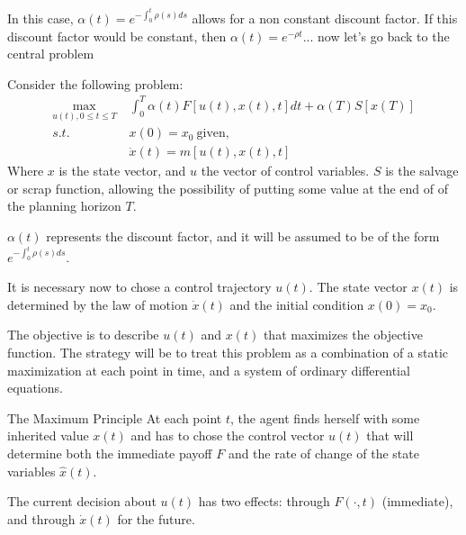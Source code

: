 \documentclass[aspectratio=169]{beamer}
\begin{document}
\begin{frame}{}
    In this case, $\alpha(t)=e^{-\int_0^t \rho(s)ds}$ allows for a non constant discount factor. If this discount factor would be constant, then $\alpha(t)=e^{-\rho t}$... now let's go back to the central problem
\end{frame}

\begin{frame}

Consider the following problem:
\begin{align}
    \max_{u(t),0\leq t\leq T}\ &\int_0^T \alpha(t) F[u(t),x(t),t]dt + \alpha(T)S[x(T)]\label{prob}\\
    s.t.\ &x(0)=x_0\ \text{given},\nonumber\\
    &\dot{x}(t)=m[u(t),x(t),t]\nonumber
\end{align}
Where $x$ is the state vector, and $u$ the vector of control variables. $S$ is the salvage or scrap function, allowing the possibility of putting some value at the end of of the planning horizon $T$.\par

$\alpha(t)$ represents the discount factor, and it will be assumed to be of the form $e^{-\int_0^t \rho(s)ds}$.
    
\end{frame}

\begin{frame}
    It is necessary now to chose a control trajectory $u(t)$. The state vector $x(t)$ is determined by the law of motion $\dot{x}(t)$ and the initial condition $x(0)=x_0$.
    
    \vspace{0.5cm}
    
    The objective is to describe $u(t)$ and $x(t)$ that maximizes the objective function. The strategy will be to treat this problem as a combination of a static maximization at each point in time, and a system of ordinary differential equations.
\end{frame}

\begin{frame}{The Maximum Principle}
    At each point $t$, the agent finds herself with some inherited value $x(t)$ and has to chose the control vector $u(t)$ that will determine both the immediate payoff $F$ and the rate of change of the state variables $\hat{x}(t)$.
    
    \vspace{0.5cm}
    
    The current decision about $u(t)$ has two effects: through $F(\cdot,t)$ (immediate), and through $\dot{x}(t)$ for the future.
    
    \vspace{0.4cm}
    
\end{frame}
\end{document}
